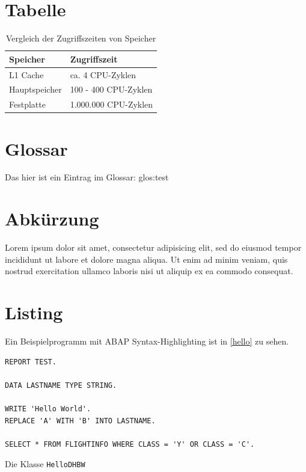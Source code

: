\section{Tabelle}

\begin{table}[htbp]%
\centering%
\begin{tabular}{| p{3cm} | p{5cm} |}
\hline
Speicher & Zugriffszeit \\
\hline
\hline
L1 Cache & ca. 4 CPU-Zyklen  \\ \hline
Hauptspeicher & 100 - 400 CPU-Zyklen \\ \hline
Festplatte & 1.000.000 CPU-Zyklen \\ \hline
\end{tabular} 
\caption[Vergleich der Zugriffszeiten von Speicher]{Vergleich der Zugriffszeiten von Speicher\label{table:zugriff}\protect \footnotemark}
\end{table}

\section{Glossar}
Das hier ist ein Eintrag im Glossar: \gls{glos:test}

\section{Abkürzung}
Lorem ipsum dolor sit amet, consectetur adipisicing elit, sed do eiusmod tempor incididunt ut labore et dolore magna aliqua. Ut enim ad minim veniam, quis nostrud exercitation ullamco laboris nisi ut aliquip ex ea commodo consequat.

\section{Listing}
Ein Beispielprogramm mit ABAP Syntax-Highlighting ist in \vref{hello} zu sehen.

\begin{programm}[htbp]
\begin{lstlisting}
REPORT TEST.

DATA LASTNAME TYPE STRING.

WRITE 'Hello World'.
REPLACE 'A' WITH 'B' INTO LASTNAME.

SELECT * FROM FLIGHTINFO WHERE CLASS = 'Y' OR CLASS = 'C'.
\end{lstlisting}
\caption{Die Klasse \texttt{HelloDHBW}\label{hello}}
\end{programm}


